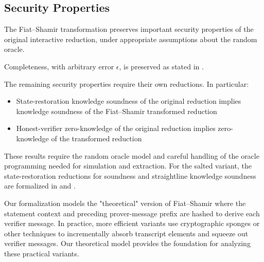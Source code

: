 \subsection{Security Properties}\label{sec:fiat_shamir_security}

The Fiat--Shamir transformation preserves important security properties of the original interactive reduction, under appropriate assumptions about the random oracle.

Completeness, with arbitrary error \(\epsilon\), is preserved as stated in .

\begin{remark}
    The remaining security properties require their own reductions. In particular:
    \begin{itemize}
        \item State-restoration knowledge soundness of the original reduction implies knowledge soundness of the Fiat--Shamir transformed reduction
        \item Honest-verifier zero-knowledge of the original reduction implies zero-knowledge of the transformed reduction
    \end{itemize}
    These results require the random oracle model and careful handling of the oracle
    programming needed for simulation and extraction. For the salted variant,
    the state-restoration reductions for soundness and straightline knowledge soundness are
    formalized in  and
    .
\end{remark}

\begin{remark}
    Our formalization models the "theoretical" version of Fiat--Shamir where the statement context and preceding prover-message prefix are hashed to derive each verifier message. In practice, more efficient variants use cryptographic sponges or other techniques to incrementally absorb transcript elements and squeeze out verifier messages. Our theoretical model provides the foundation for analyzing these practical variants.
\end{remark}


